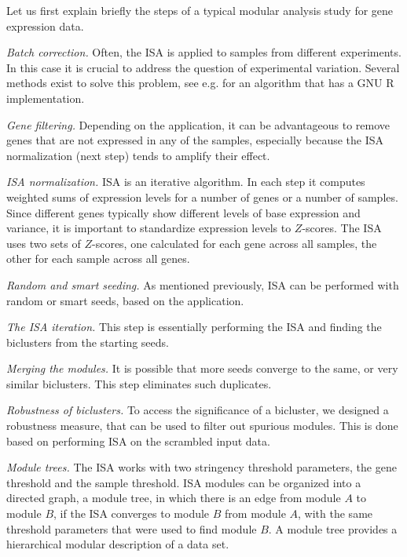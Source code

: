 \documentclass{bioinfo}
\begin{document}
Let us first explain briefly the steps of a typical modular
analysis study for gene expression data.

\emph{Batch correction.}
Often, the ISA is applied to samples from different experiments. In
this case it is crucial to address the question of experimental
variation. Several methods exist to solve this problem,
see e.g. \cite{johnson07} for an algorithm that has a GNU R
implementation.

\emph{Gene filtering.}
Depending on the application, it can be advantageous to remove genes
that are not expressed in any of the samples, especially because the
ISA normalization (next step) tends to amplify their effect.

\emph{ISA normalization.}
ISA is an iterative algorithm. In each step it computes weighted sums
of expression levels for a number of genes or a number of
samples. Since different genes typically show different levels of base
expression and variance, it is important to standardize expression
levels to $Z$-scores. The ISA uses two sets of $Z$-scores, one
calculated for each gene across all samples, the other for each sample
across all genes.

\emph{Random and smart seeding.}
As mentioned previously, ISA can be performed with random or smart
seeds, based on the application.

\emph{The ISA iteration.}
This step is essentially performing the ISA and finding the biclusters
from the starting seeds.

\emph{Merging the modules.}
It is possible that more seeds converge to the same, or very similar
biclusters. This step eliminates such duplicates.

\emph{Robustness of biclusters.}
To access the significance of a bicluster, we designed a robustness
measure, that can be used to filter out spurious modules. This is done
based on performing ISA on the scrambled input data.

\emph{Module trees.}
The ISA works with two stringency threshold parameters, the gene
threshold and the sample threshold. ISA modules can be organized into
a directed graph, a module tree, in which there is an edge from module
$A$ to module $B$, if the ISA converges to module $B$ from module $A$,
with the same threshold parameters  that were used to find module
$B$. A module tree provides a hierarchical modular description of a
data set.
\end{document}
